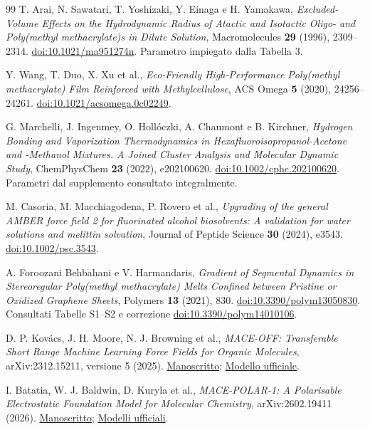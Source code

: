 \documentclass[11pt,reqno]{amsart}
\numberwithin{equation}{section}
\begin{document}
\begin{thebibliography}{99}
T. Arai, N. Sawatari, T. Yoshizaki, Y. Einaga e H. Yamakawa,
\emph{Excluded-Volume Effects on the Hydrodynamic Radius of Atactic and
Isotactic Oligo- and Poly(methyl methacrylate)s in Dilute Solution},
Macromolecules \textbf{29} (1996), 2309--2314.
\href{https://doi.org/10.1021/ma951274n}{doi:10.1021/ma951274n}.
Parametro impiegato dalla Tabella 3.

Y. Wang, T. Duo, X. Xu et al., \emph{Eco-Friendly High-Performance
Poly(methyl methacrylate) Film Reinforced with Methylcellulose},
ACS Omega \textbf{5} (2020), 24256--24261.
\href{https://doi.org/10.1021/acsomega.0c02249}{doi:10.1021/acsomega.0c02249}.

G. Marchelli, J. Ingenmey, O. Holl\'oczki, A. Chaumont e B. Kirchner,
\emph{Hydrogen Bonding and Vaporization Thermodynamics in
Hexafluoroisopropanol-Acetone and -Methanol Mixtures.
A Joined Cluster Analysis and Molecular Dynamic Study},
ChemPhysChem \textbf{23} (2022), e202100620.
\href{https://doi.org/10.1002/cphc.202100620}{doi:10.1002/cphc.202100620}.
Parametri dal supplemento consultato integralmente.

M. Casoria, M. Macchiagodena, P. Rovero et al.,
\emph{Upgrading of the general AMBER force field 2 for fluorinated
alcohol biosolvents: A validation for water solutions and melittin solvation},
Journal of Peptide Science \textbf{30} (2024), e3543.
\href{https://doi.org/10.1002/psc.3543}{doi:10.1002/psc.3543}.

A. Foroozani Behbahani e V. Harmandaris,
\emph{Gradient of Segmental Dynamics in Stereoregular Poly(methyl
methacrylate) Melts Confined between Pristine or Oxidized Graphene Sheets},
Polymers \textbf{13} (2021), 830.
\href{https://doi.org/10.3390/polym13050830}{doi:10.3390/polym13050830}.
Consultati Tabelle S1--S2 e correzione
\href{https://doi.org/10.3390/polym14010106}{doi:10.3390/polym14010106}.

D. P. Kov\'acs, J. H. Moore, N. J. Browning et al.,
\emph{MACE-OFF: Transferable Short Range Machine Learning Force Fields
for Organic Molecules}, arXiv:2312.15211, versione 5 (2025).
\href{https://arxiv.org/abs/2312.15211v5}{Manoscritto};
\href{https://github.com/ACEsuit/mace-off}{Modello ufficiale}.

I. Batatia, W. J. Baldwin, D. Kuryla et al.,
\emph{MACE-POLAR-1: A Polarisable Electrostatic Foundation Model
for Molecular Chemistry}, arXiv:2602.19411 (2026).
\href{https://arxiv.org/abs/2602.19411}{Manoscritto};
\href{https://github.com/ACEsuit/mace-foundations/releases/tag/mace_polar_1}{Modelli ufficiali}.
\end{thebibliography}
\end{document}
